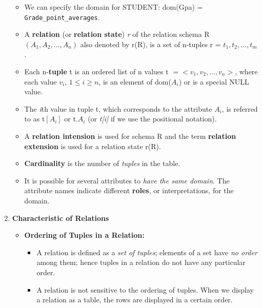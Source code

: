 \documentclass[10pt]{article}
\newcommand{\tf}{\textbf}
\newcommand{\ti}{\textit}
\newcommand{\ttt}{\texttt}
\begin{document}
\begin{enumerate}
\begin{itemize}
		\item We can specify the domain for STUDENT: dom(Gpa) = \ttt{Grade\_point\_averages}.
		\item A \tf{relation} (or \tf{relation state}) \ti{r} of the relation schema R$(A_1, A_2, \ldots, A_n)$ also denoted by r(R), is a set of n-tuples r = ${t_1, t_2, \ldots, t_m}$.
		\item Each n-\tf{tuple} t is an ordered list of n values t $=<v_1, v_2, \ldots, v_n>$, where each value $v_i$, $1 \le i \ge n$, is an element of dom($A_{i}$) or is a special NULL value.
		\item The \ti{i}th value in tuple t, which corresponds to the attribute $A_{i}$, is referred to as t$[A_{i}]$ or t.$A_{i}$ (or \ti{t[i]} if we use the positional notation).
		\item A \tf{relation intension} is used for schema R and the term \tf{relation extension} is used for a relation state r(R).
		\item \tf{Cardinality} is the number of \ti{tuples} in the table.
		\item It is possible for several attributes to \ti{have the same domain}. The attribute names indicate different \tf{roles}, or interpretations, for the domain.
	\end{itemize}

	\item \tf{Characteristic of Relations}
	\begin{itemize}
		\item \tf{Ordering of Tuples in a Relation: }
		\begin{itemize}
			\item A relation is defined as a \ti{set of tuples}; elements of a set have \ti{no order} among them; hence tuples in a relation do not have any particular order.
			\item A relation is not sensitive to the ordering of tuples. When we display a relation as a table, the rows are displayed in a certain order. 
		\end{itemize}


\end{itemize}
\end{enumerate}
\end{document}
